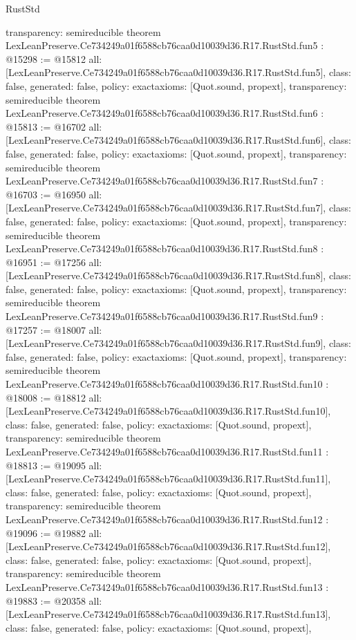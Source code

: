\begin{lexlean}{RustStd}
\begin{coremodule}
{  transparency: semireducible
}
theorem LexLeanPreserve.Ce734249a01f6588cb76caa0d10039d36.R17.RustStd.fun5 : @15298 := @15812 {
  all: [LexLeanPreserve.Ce734249a01f6588cb76caa0d10039d36.R17.RustStd.fun5],
  class: false,
  generated: false,
  policy: exact{axioms: [Quot.sound, propext]},
  transparency: semireducible
}
theorem LexLeanPreserve.Ce734249a01f6588cb76caa0d10039d36.R17.RustStd.fun6 : @15813 := @16702 {
  all: [LexLeanPreserve.Ce734249a01f6588cb76caa0d10039d36.R17.RustStd.fun6],
  class: false,
  generated: false,
  policy: exact{axioms: [Quot.sound, propext]},
  transparency: semireducible
}
theorem LexLeanPreserve.Ce734249a01f6588cb76caa0d10039d36.R17.RustStd.fun7 : @16703 := @16950 {
  all: [LexLeanPreserve.Ce734249a01f6588cb76caa0d10039d36.R17.RustStd.fun7],
  class: false,
  generated: false,
  policy: exact{axioms: [Quot.sound, propext]},
  transparency: semireducible
}
theorem LexLeanPreserve.Ce734249a01f6588cb76caa0d10039d36.R17.RustStd.fun8 : @16951 := @17256 {
  all: [LexLeanPreserve.Ce734249a01f6588cb76caa0d10039d36.R17.RustStd.fun8],
  class: false,
  generated: false,
  policy: exact{axioms: [Quot.sound, propext]},
  transparency: semireducible
}
theorem LexLeanPreserve.Ce734249a01f6588cb76caa0d10039d36.R17.RustStd.fun9 : @17257 := @18007 {
  all: [LexLeanPreserve.Ce734249a01f6588cb76caa0d10039d36.R17.RustStd.fun9],
  class: false,
  generated: false,
  policy: exact{axioms: [Quot.sound, propext]},
  transparency: semireducible
}
theorem LexLeanPreserve.Ce734249a01f6588cb76caa0d10039d36.R17.RustStd.fun10 : @18008 := @18812 {
  all: [LexLeanPreserve.Ce734249a01f6588cb76caa0d10039d36.R17.RustStd.fun10],
  class: false,
  generated: false,
  policy: exact{axioms: [Quot.sound, propext]},
  transparency: semireducible
}
theorem LexLeanPreserve.Ce734249a01f6588cb76caa0d10039d36.R17.RustStd.fun11 : @18813 := @19095 {
  all: [LexLeanPreserve.Ce734249a01f6588cb76caa0d10039d36.R17.RustStd.fun11],
  class: false,
  generated: false,
  policy: exact{axioms: [Quot.sound, propext]},
  transparency: semireducible
}
theorem LexLeanPreserve.Ce734249a01f6588cb76caa0d10039d36.R17.RustStd.fun12 : @19096 := @19882 {
  all: [LexLeanPreserve.Ce734249a01f6588cb76caa0d10039d36.R17.RustStd.fun12],
  class: false,
  generated: false,
  policy: exact{axioms: [Quot.sound, propext]},
  transparency: semireducible
}
theorem LexLeanPreserve.Ce734249a01f6588cb76caa0d10039d36.R17.RustStd.fun13 : @19883 := @20358 {
  all: [LexLeanPreserve.Ce734249a01f6588cb76caa0d10039d36.R17.RustStd.fun13],
  class: false,
  generated: false,
  policy: exact{axioms: [Quot.sound, propext]},
}
\end{coremodule}
\end{lexlean}
